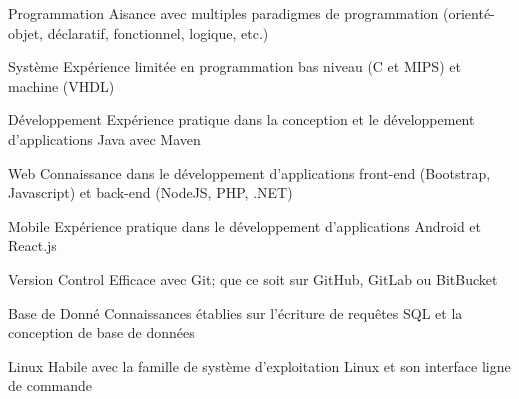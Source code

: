 

\begin{cvskills}

    
  \cvskill
    {Programmation} %
    {Aisance avec multiples paradigmes de programmation (orienté-objet, déclaratif, fonctionnel, logique, etc.)}

  \cvskill
    {Système} %
    {Expérience limitée en programmation bas niveau (C et MIPS) et machine (VHDL)}

  \cvskill
    {Développement} %
    {Expérience pratique dans la conception et le développement d'applications Java avec Maven}
    
  \cvskill
    {Web} %
    {Connaissance dans le développement d'applications front-end (Bootstrap, Javascript) et back-end (NodeJS, PHP, .NET)}
  
  \cvskill
    {Mobile} %
    {Expérience pratique dans le développement d'applications Android et React.js}
    
  \cvskill
    {Version Control} %
    {Efficace avec Git; que ce soit sur GitHub, GitLab ou BitBucket}
    
  \cvskill
    {Base de Donné} %
    {Connaissances établies sur l'écriture de requêtes SQL et la conception de base de données}
    
  \cvskill
    {Linux} %
    {Habile avec la famille de système d'exploitation Linux et son interface ligne de commande}

\end{cvskills}
